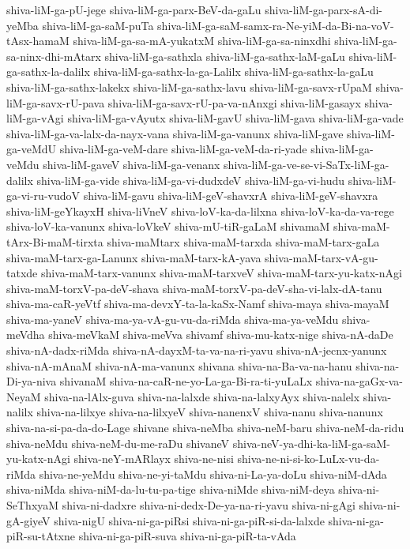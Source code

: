 {shiva-liM-ga-pU-jege
shiva-liM-ga-parx-BeV-da-gaLu
shiva-liM-ga-parx-sA-di-yeMba
shiva-liM-ga-saM-puTa
shiva-liM-ga-saM-samx-ra-Ne-yiM-da-Bi-na-voV-tAsx-hamaM
shiva-liM-ga-sa-mA-yukatxM
shiva-liM-ga-sa-ninxdhi
shiva-liM-ga-sa-ninx-dhi-mAtarx
shiva-liM-ga-sathxla
shiva-liM-ga-sathx-laM-gaLu
shiva-liM-ga-sathx-la-dalilx
shiva-liM-ga-sathx-la-ga-Lalilx
shiva-liM-ga-sathx-la-gaLu
shiva-liM-ga-sathx-lakekx
shiva-liM-ga-sathx-lavu
shiva-liM-ga-savx-rUpaM
shiva-liM-ga-savx-rU-pava
shiva-liM-ga-savx-rU-pa-va-nAnxgi
shiva-liM-gasayx
shiva-liM-ga-vAgi
shiva-liM-ga-vAyutx
shiva-liM-gavU
shiva-liM-gava
shiva-liM-ga-vade
shiva-liM-ga-va-lalx-da-nayx-vana
shiva-liM-ga-vanunx
shiva-liM-gave
shiva-liM-ga-veMdU
shiva-liM-ga-veM-dare
shiva-liM-ga-veM-da-ri-yade
shiva-liM-ga-veMdu
shiva-liM-gaveV
shiva-liM-ga-venanx
shiva-liM-ga-ve-se-vi-SaTx-liM-ga-dalilx
shiva-liM-ga-vide
shiva-liM-ga-vi-dudxdeV
shiva-liM-ga-vi-hudu
shiva-liM-ga-vi-ru-vudoV
shiva-liM-gavu
shiva-liM-geV-shavxrA
shiva-liM-geV-shavxra
shiva-liM-geYkayxH
shiva-liVneV
shiva-loV-ka-da-lilxna
shiva-loV-ka-da-va-rege
shiva-loV-ka-vanunx
shiva-loVkeV
shiva-mU-tiR-gaLaM
shivamaM
shiva-maM-tArx-Bi-maM-tirxta
shiva-maMtarx
shiva-maM-tarxda
shiva-maM-tarx-gaLa
shiva-maM-tarx-ga-Lanunx
shiva-maM-tarx-kA-yava
shiva-maM-tarx-vA-gu-tatxde
shiva-maM-tarx-vanunx
shiva-maM-tarxveV
shiva-maM-tarx-yu-katx-nAgi
shiva-maM-torxV-pa-deV-shava
shiva-maM-torxV-pa-deV-sha-vi-lalx-dA-tanu
shiva-ma-caR-yeVtf
shiva-ma-devxY-ta-la-kaSx-Namf
shiva-maya
shiva-mayaM
shiva-ma-yaneV
shiva-ma-ya-vA-gu-vu-da-riMda
shiva-ma-ya-veMdu
shiva-meVdha
shiva-meVkaM
shiva-meVva
shivamf
shiva-mu-katx-nige
shiva-nA-daDe
shiva-nA-dadx-riMda
shiva-nA-dayxM-ta-va-na-ri-yavu
shiva-nA-jecnx-yanunx
shiva-nA-mAnaM
shiva-nA-ma-vanunx
shivana
shiva-na-Ba-va-na-hanu
shiva-na-Di-ya-niva
shivanaM
shiva-na-caR-ne-yo-La-ga-Bi-ra-ti-yuLaLx
shiva-na-gaGx-va-NeyaM
shiva-na-lAlx-guva
shiva-na-lalxde
shiva-na-lalxyAyx
shiva-nalelx
shiva-nalilx
shiva-na-lilxye
shiva-na-lilxyeV
shiva-nanenxV
shiva-nanu
shiva-nanunx
shiva-na-si-pa-da-do-Lage
shivane
shiva-neMba
shiva-neM-baru
shiva-neM-da-ridu
shiva-neMdu
shiva-neM-du-me-raDu
shivaneV
shiva-neV-ya-dhi-ka-liM-ga-saM-yu-katx-nAgi
shiva-neY-mARlayx
shiva-ne-nisi
shiva-ne-ni-si-ko-LuLx-vu-da-riMda
shiva-ne-yeMdu
shiva-ne-yi-taMdu
shiva-ni-La-ya-doLu
shiva-niM-dAda
shiva-niMda
shiva-niM-da-lu-tu-pa-tige
shiva-niMde
shiva-niM-deya
shiva-ni-SeThxyaM
shiva-ni-dadxre
shiva-ni-dedx-De-ya-na-ri-yavu
shiva-ni-gAgi
shiva-ni-gA-giyeV
shiva-nigU
shiva-ni-ga-piRsi
shiva-ni-ga-piR-si-da-lalxde
shiva-ni-ga-piR-su-tAtxne
shiva-ni-ga-piR-suva
shiva-ni-ga-piR-ta-vAda
}
